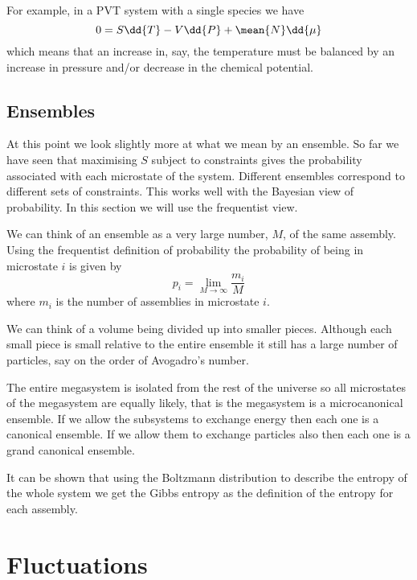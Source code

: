 \documentclass[fleqn]{NotesClass}
\begin{document}
    For example, in a PVT system with a single species we have
    \begin{equation}
        0 = S\dd{T} - V\dd{P} + \mean{N}\dd{\mu}
    \end{equation}
    which means that an increase in, say, the temperature must be balanced by an increase in pressure and/or decrease in the chemical potential.
    
    \section{Ensembles}
    At this point we look slightly more at what we mean by an ensemble.
    So far we have seen that maximising \(S\) subject to constraints gives the probability associated with each microstate of the system.
    Different ensembles correspond to different sets of constraints.
    This works well with the Bayesian view of probability.
    In this section we will use the frequentist view.
    
    We can think of an ensemble as a very large number, \(M\), of the same assembly.
    Using the frequentist definition of probability the probability of being in microstate \(i\) is given by
    \begin{equation}
        p_i = \lim_{M \to \infty} \frac{m_i}{M}
    \end{equation}
    where \(m_i\) is the number of assemblies in microstate \(i\).
    
    We can think of a volume being divided up into smaller pieces.
    Although each small piece is small relative to the entire ensemble it still has a large number of particles, say on the order of Avogadro's number.
    
    The entire megasystem is isolated from the rest of the universe so all microstates of the megasystem are equally likely, that is the megasystem is a microcanonical ensemble.
    If we allow the subsystems to exchange energy then each one is a canonical ensemble.
    If we allow them to exchange particles also then each one is a grand canonical ensemble.
    
    It can be shown that using the Boltzmann distribution to describe the entropy of the whole system we get the Gibbs entropy as the definition of the entropy for each assembly.
    
    \chapter{Fluctuations}
\end{document}

